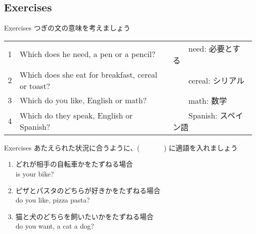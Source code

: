 \documentclass[aspectratio=169,xcolor={dvipsnames,table}]{beamer}
\begin{document}
\subsection{Exercises}
\begin{frame}[plain]{Exercises}
つぎの文の意味を考えましょう

\begin{tabular}{rll}
1& Which does he need, a pen or a pencil? &　　{\small need: 必要とする} \\
2&Which does she eat for breakfast, cereal or toast? & 　　{\small cereal: シリアル}\\
3& Which do you like, English or math? & 　　{\small math: 数学}\\
4& Which do they speak, English or Spanish?&　　{\small Spanish: スペイン語} \\
\end{tabular}

\mbox{}\hfill{}
\end{frame}
\begin{frame}[plain]{Exercises}
 あたえられた状況に合うように、(~~~~~~~) に適語を入れましょう

\begin{enumerate}
 \item どれが相手の自転車かをたずねる場合\\
 is your bike?
 \item ピザとパスタのどちらが好きかをたずねる場合\\
 do you like, pizza  pasta?
 \item 猫と犬のどちらを飼いたいかをたずねる場合\\
 do you want, a cat  a dog?
\end{enumerate}

\mbox{}\hfill{}

\end{frame}
\end{document}
